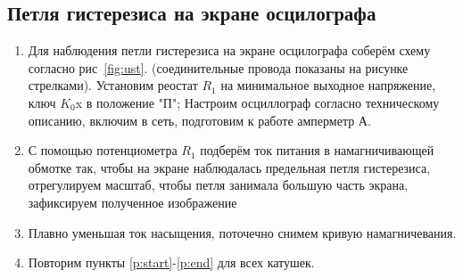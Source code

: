 \documentclass[14pt,a4paper]{article}
\begin{document}
\subsection*{Петля гистерезиса на экране осцилографа}
\begin{enumerate}
  \item Для наблюдения петли гистерезиса на экране осцилографа соберём схему согласно рис~\ref{fig:ust}. (соединительные провода показаны на рисунке стрелками).
  Установим реостат $R_1$ на минимальное выходное напряжение, ключ $K_0$x в положение "П";
  Настроим осциллограф согласно техническому описанию, включим в сеть, подготовим к работе амперметр А.
  \item \label{p:start} С помощью потенциометра $R_1$ подберём ток питания в намагничивающей обмотке так, чтобы на экране наблюдалась предельная петля гистерезиса, отрегулируем масштаб, чтобы петля занимала большую часть экрана, зафиксируем полученное изображение
  \item\label{p:end} Плавно уменьшая ток насыщения, поточечно снимем кривую намагничевания.
  \item Повторим пункты \ref{p:start}-\ref{p:end} для всех катушек.
\end{enumerate}
\end{document}
